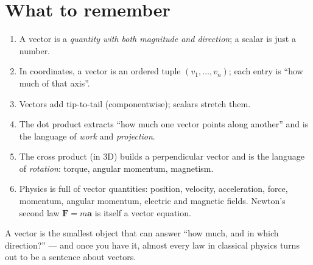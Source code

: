 \documentclass[11pt,a4paper]{article}
\newcommand{\vect}[1]{\boldsymbol{#1}}
\begin{document}
\section{What to remember}

\begin{enumerate}[label=\textbf{\arabic*.}]
  \item A vector is a \emph{quantity with both magnitude and direction};
        a scalar is just a number.
  \item In coordinates, a vector is an ordered tuple $(v_1,\dots,v_n)$;
        each entry is ``how much of that axis''.
  \item Vectors add tip-to-tail (componentwise); scalars stretch them.
  \item The dot product extracts ``how much one vector points along another''
        and is the language of \emph{work} and \emph{projection}.
  \item The cross product (in 3D) builds a perpendicular vector and is the
        language of \emph{rotation}: torque, angular momentum, magnetism.
  \item Physics is full of vector quantities: position, velocity, acceleration,
        force, momentum, angular momentum, electric and magnetic fields.
        Newton's second law $\vect{F} = m\vect{a}$ is itself a vector equation.
\end{enumerate}

\begin{keypointblock}
A vector is the smallest object that can answer ``how much, and in which direction?''
--- and once you have it, almost every law in classical physics turns out to be a
sentence about vectors.
\end{keypointblock}
\end{document}
